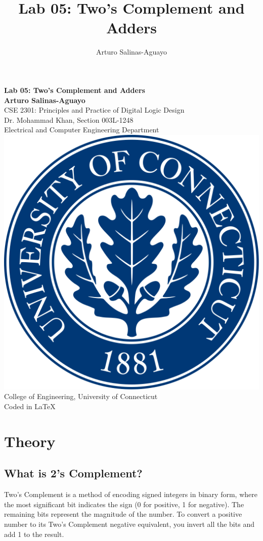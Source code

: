 \documentclass[12pt]{article}
\author{Arturo Salinas-Aguayo}
\title{Lab 05: Two's Complement and Adders}
\begin{document}
\newcommand{\closure}[2][3]{%
	{}\mkern#1mu\overline{\mkern-#1mu#2}}
\newcommand\ncoverline[1]{\mkern1mu\overline{\mkern-1mu#1\mkern-1mu}\mkern1mu}
\begin{titlepage}
	\centering
	\vspace*{3cm}
	\huge\textbf{Lab 05: Two's Complement and Adders}\\
	\vspace{5cm}
	\Large\textbf{Arturo Salinas-Aguayo}\\
	\normalsize
	CSE 2301: Principles and Practice of Digital Logic Design\\
	Dr. Mohammad Khan, Section 003L-1248\\
	Electrical and Computer Engineering Department
	\vfill
	\includegraphics[scale=0.1]{uconnlogo}\\
	College of Engineering, University of Connecticut\\
	\scriptsize{Coded in \LaTeX}
	\vspace*{1cm}
\end{titlepage}

\section*{Theory}
\subsection*{What is 2’s Complement?}
Two’s Complement is a method of encoding signed integers in binary form, where the most significant bit indicates the sign (0 for positive, 1 for negative). The remaining bits represent the magnitude of the number. To convert a positive number to its Two’s Complement negative equivalent, you invert all the bits and add 1 to the result.
\end{document}
